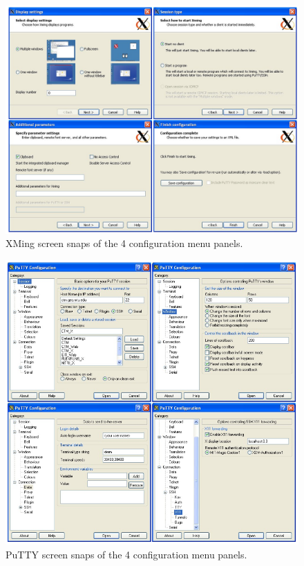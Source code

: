 \begin{figure}[h!]
\centering
\includegraphics[width=.75\textwidth]{images/XmingConfig.png}
\caption{XMing screen snaps of the 4 configuration menu panels.} %
\label{figure:}
\end{figure}

\begin{figure}[h!]
\centering
\includegraphics[width=.7\textwidth]{images/PuYYTXming.png}
\caption{PuTTY screen snaps of the 4 configuration menu panels.} %
\label{figure:}
\end{figure}



